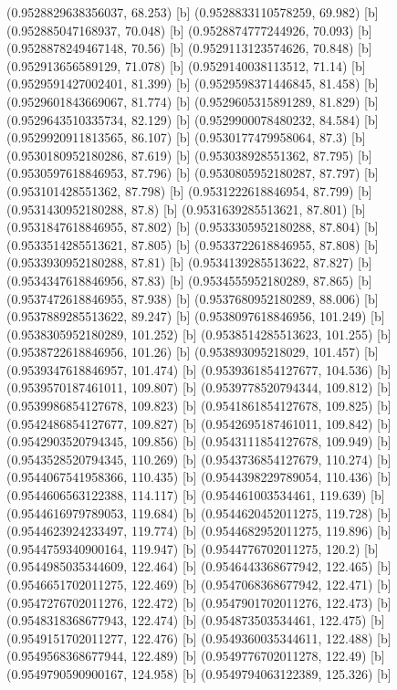 {{{(0.9528829638356037, 68.253) [b] 
(0.9528833110578259, 69.982) [b] 
(0.952885047168937, 70.048) [b] 
(0.9528874777244926, 70.093) [b] 
(0.9528878249467148, 70.56) [b] 
(0.9529113123574626, 70.848) [b] 
(0.952913656589129, 71.078) [b] 
(0.9529140038113512, 71.14) [b] 
(0.9529591427002401, 81.399) [b] 
(0.9529598371446845, 81.458) [b] 
(0.9529601843669067, 81.774) [b] 
(0.9529605315891289, 81.829) [b] 
(0.9529643510335734, 82.129) [b] 
(0.9529900078480232, 84.584) [b] 
(0.9529920911813565, 86.107) [b] 
(0.9530177479958064, 87.3) [b] 
(0.9530180952180286, 87.619) [b] 
(0.953038928551362, 87.795) [b] 
(0.9530597618846953, 87.796) [b] 
(0.9530805952180287, 87.797) [b] 
(0.953101428551362, 87.798) [b] 
(0.9531222618846954, 87.799) [b] 
(0.9531430952180288, 87.8) [b] 
(0.9531639285513621, 87.801) [b] 
(0.9531847618846955, 87.802) [b] 
(0.9533305952180288, 87.804) [b] 
(0.9533514285513621, 87.805) [b] 
(0.9533722618846955, 87.808) [b] 
(0.9533930952180288, 87.81) [b] 
(0.9534139285513622, 87.827) [b] 
(0.9534347618846956, 87.83) [b] 
(0.9534555952180289, 87.865) [b] 
(0.9537472618846955, 87.938) [b] 
(0.9537680952180289, 88.006) [b] 
(0.9537889285513622, 89.247) [b] 
(0.9538097618846956, 101.249) [b] 
(0.9538305952180289, 101.252) [b] 
(0.9538514285513623, 101.255) [b] 
(0.9538722618846956, 101.26) [b] 
(0.953893095218029, 101.457) [b] 
(0.9539347618846957, 101.474) [b] 
(0.9539361854127677, 104.536) [b] 
(0.9539570187461011, 109.807) [b] 
(0.9539778520794344, 109.812) [b] 
(0.9539986854127678, 109.823) [b] 
(0.9541861854127678, 109.825) [b] 
(0.9542486854127677, 109.827) [b] 
(0.9542695187461011, 109.842) [b] 
(0.9542903520794345, 109.856) [b] 
(0.9543111854127678, 109.949) [b] 
(0.9543528520794345, 110.269) [b] 
(0.9543736854127679, 110.274) [b] 
(0.9544067541958366, 110.435) [b] 
(0.9544398229789054, 110.436) [b] 
(0.9544606563122388, 114.117) [b] 
(0.954461003534461, 119.639) [b] 
(0.9544616979789053, 119.684) [b] 
(0.9544620452011275, 119.728) [b] 
(0.9544623924233497, 119.774) [b] 
(0.9544682952011275, 119.896) [b] 
(0.9544759340900164, 119.947) [b] 
(0.9544776702011275, 120.2) [b] 
(0.9544985035344609, 122.464) [b] 
(0.9546443368677942, 122.465) [b] 
(0.9546651702011275, 122.469) [b] 
(0.9547068368677942, 122.471) [b] 
(0.9547276702011276, 122.472) [b] 
(0.9547901702011276, 122.473) [b] 
(0.9548318368677943, 122.474) [b] 
(0.954873503534461, 122.475) [b] 
(0.9549151702011277, 122.476) [b] 
(0.9549360035344611, 122.488) [b] 
(0.9549568368677944, 122.489) [b] 
(0.9549776702011278, 122.49) [b] 
(0.9549790590900167, 124.958) [b] 
(0.9549794063122389, 125.326) [b] 
}}}
